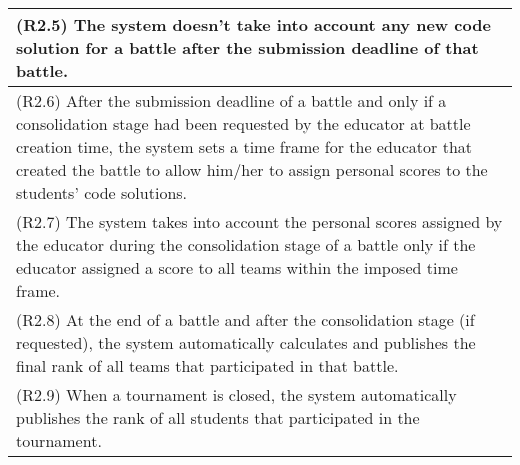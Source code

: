 \begin{longtable}{|p{16.5cm}|}
(R2.5) The system doesn't take into account any new code solution for a battle after the submission deadline of that battle.  \\
\hline
(R2.6) After the submission deadline of a battle and only if a consolidation stage had been requested by the educator at battle creation time, the system sets a time frame for the educator that created the battle to allow him/her to assign personal scores to the students’ code solutions.  \\
\hline
(R2.7) The system takes into account the personal scores assigned by the educator during the consolidation stage of a battle only if the educator assigned a score to all teams within the imposed time frame. \\
\hline
(R2.8) At the end of a battle and after the consolidation stage (if requested), the system automatically calculates and publishes the final rank of all teams that participated in that battle.  \\
\hline
(R2.9) When a tournament is closed, the system automatically publishes the rank of all students that participated in the tournament. \\
\hline

\end{longtable}

\vspace*{1cm}

